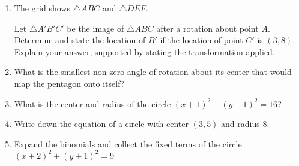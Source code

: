 \documentclass[12pt, twoside]{article}
\begin{document}
\begin{enumerate}
   \item The grid shows $\triangle ABC$ and $\triangle DEF$.
     \begin{center}
     \end{center}
     Let $\triangle A'B'C'$ be the image of $\triangle ABC$ after a rotation about point $A$. Determine and state the location of $B'$ if the location of point $C'$ is $(3,8)$. Explain your answer, supported by stating the transformation applied.

 \newpage

  \item What is the smallest non-zero angle of rotation about its center that would map the pentagon onto itself? \vspace{0.25cm} %
  \begin{center}
   \end{center} \vspace{0.5cm}

  \item What is the center and radius of the circle $(x+1)^2+(y-1)^2=16$? \vspace{2cm}

  \item Write down the equation of a circle with center $(3,5)$ and radius 8. \vspace{2cm}

  \item Expand the binomials and collect the fixed terms of the circle  $(x+2)^2+(y+1)^2=9$ \vspace{4cm}


\end{enumerate}
\end{document}
